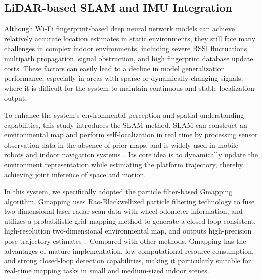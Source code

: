 \documentclass[12pt,a4paper]{article}
\numberwithin{equation}{section}
\begin{document}
\subsection{LiDAR-based SLAM and IMU Integration}
Although Wi-Fi fingerprint-based deep neural network models can achieve
relatively accurate location estimates in static environments, they still face
many challenges in complex indoor environments, including severe RSSI
fluctuations, multipath propagation, signal obstruction, and high fingerprint
database update costs. These factors can easily lead to a decline in model
generalization performance, especially in areas with sparse or dynamically
changing signals, where it is difficult for the system to maintain continuous
and stable localization output.

To enhance the system's environmental perception and spatial understanding
capabilities, this study introduces the SLAM method. SLAM can construct an
environmental map and perform self-localization in real time by processing
sensor observation data in the absence of prior maps, and is widely used in
mobile robots and indoor navigation systems~\cite{durrant2006slam}. Its core
idea is to dynamically update the environment representation while estimating
the platform trajectory, thereby achieving joint inference of space and motion.

In this system, we specifically adopted the particle filter-based Gmapping
algorithm. Gmapping uses Rao-Blackwellized particle filtering technology to fuse
two-dimensional laser radar scan data with wheel odometer information, and
utilizes a probabilistic grid mapping method to generate a closed-loop
consistent, high-resolution two-dimensional environmental map, and outputs
high-precision pose trajectory estimates~\cite{grisetti2007improved}. Compared
with other methods, Gmapping has the advantages of mature implementation, low
computational resource consumption, and strong closed-loop detection
capabilities, making it particularly suitable for real-time mapping tasks in
small and medium-sized indoor scenes.
\end{document}
